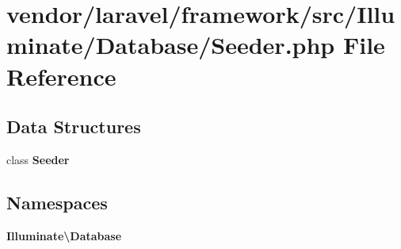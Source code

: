 \section{vendor/laravel/framework/src/\+Illuminate/\+Database/\+Seeder.php File Reference}
\label{_seeder_8php}
\subsection*{Data Structures}
\begin{DoxyCompactItemize}
\item 
class {\bf Seeder}
\end{DoxyCompactItemize}
\subsection*{Namespaces}
\begin{DoxyCompactItemize}
\item 
 {\bf Illuminate\textbackslash{}\+Database}
\end{DoxyCompactItemize}
